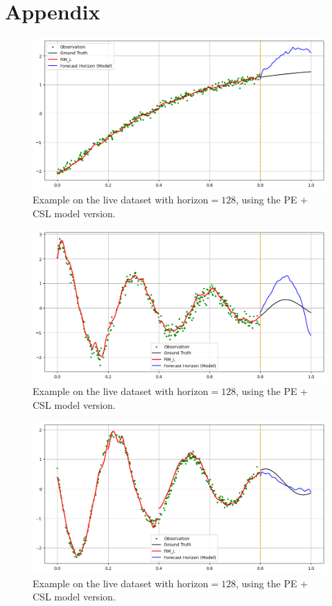 \documentclass{article}
\theoremstyle{plain}
\theoremstyle{definition}
\theoremstyle{remark}
\begin{document}
\section{Appendix}
\begin{figure}[h!]
    \centering
    \includegraphics[width=\linewidth]{assets/test1.png}
    \caption{Example on the live dataset with $\text{horizon}=128$, using the PE + CSL model version.
    }\label{fig:test1}
\end{figure}
\begin{figure}[h!]
    \centering
    \includegraphics[width=\linewidth]{assets/test2.png}
    \caption{Example on the live dataset with $\text{horizon}=128$, using the PE + CSL model version.
    }\label{fig:test2}
\end{figure}
\begin{figure}[h!]
    \centering
    \includegraphics[width=\linewidth]{assets/test3.png}
    \caption{Example on the live dataset with $\text{horizon}=128$, using the PE + CSL model version.
    }\label{fig:test3}
\end{figure}
\end{document}
